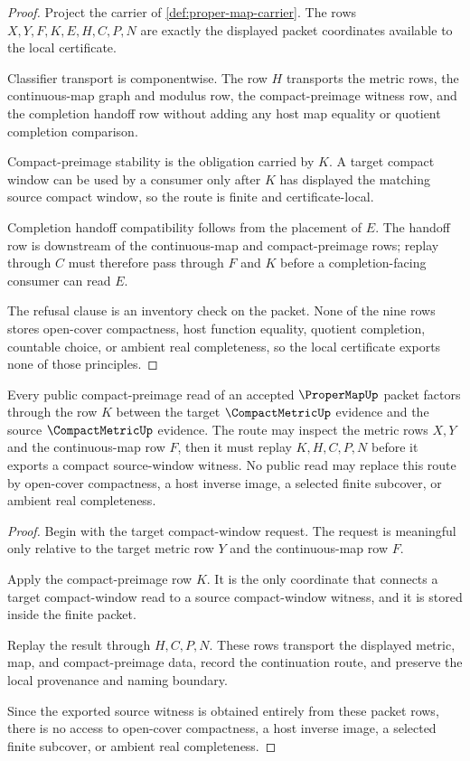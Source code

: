 \begin{proof}
Project the carrier of \autoref{def:proper-map-carrier}. The rows
$X,Y,F,K,E,H,C,P,N$ are exactly the displayed packet coordinates available to
the local certificate.

Classifier transport is componentwise. The row $H$ transports the metric rows,
the continuous-map graph and modulus row, the compact-preimage witness row, and
the completion handoff row without adding any host map equality or quotient
completion comparison.

Compact-preimage stability is the obligation carried by $K$. A target compact
window can be used by a consumer only after $K$ has displayed the matching
source compact window, so the route is finite and certificate-local.

Completion handoff compatibility follows from the placement of $E$. The handoff
row is downstream of the continuous-map and compact-preimage rows; replay
through $C$ must therefore pass through $F$ and $K$ before a completion-facing
consumer can read $E$.

The refusal clause is an inventory check on the packet. None of the nine rows
stores open-cover compactness, host function equality, quotient completion,
countable choice, or ambient real completeness, so the local certificate exports
none of those principles.
\end{proof}

\begin{theorem}
\label{thm:proper-map-compact-preimage-boundary}
Every public compact-preimage read of an accepted $\ProperMapUp$ packet factors
through the row $K$ between the target $\CompactMetricUp$ evidence and the
source $\CompactMetricUp$ evidence. The route may inspect the metric rows
$X,Y$ and the continuous-map row $F$, then it must replay $K,H,C,P,N$ before it
exports a compact source-window witness. No public read may replace this route
by open-cover compactness, a host inverse image, a selected finite subcover, or
ambient real completeness.
\end{theorem}
\begin{proof}
Begin with the target compact-window request. The request is meaningful only
relative to the target metric row $Y$ and the continuous-map row $F$.

Apply the compact-preimage row $K$. It is the only coordinate that connects a
target compact-window read to a source compact-window witness, and it is stored
inside the finite packet.

Replay the result through $H,C,P,N$. These rows transport the displayed metric,
map, and compact-preimage data, record the continuation route, and preserve the
local provenance and naming boundary.

Since the exported source witness is obtained entirely from these packet rows,
there is no access to open-cover compactness, a host inverse image, a selected
finite subcover, or ambient real completeness.
\end{proof}

